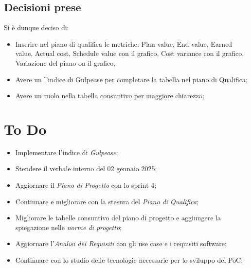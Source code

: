 \documentclass[a4paper, 12pt]{article}
\begin{document}
\subsection{Decisioni prese}
Si è dunque deciso di:
\begin{itemize}
    \item Inserire nel piano di qualifica le metriche:
    Plan value, 
    End value,
    Earned value,
    Actual cost,
    Schedule value con il grafico,
    Cost variance con il grafico,
    Variazione del piano on il grafico,
    \item Avere un l'indice di Gulpease per completare la tabella nel piano di Qualifica;
    \item Avere un ruolo nella tabella consuntivo per maggiore chiarezza;
    
\end{itemize}
\section{To Do}
\begin{itemize}
    \item Implementare l'indice di \textit{Gulpease};
    \item Stendere il verbale interno del 02 gennaio 2025;
    \item Aggiornare il \textit{Piano di Progetto} con lo sprint 4;
    \item Continuare e migliorare con la stesura del \textit{Piano di Qualifica};
    \item Migliorare le tabelle consuntivo del piano di progetto e aggiungere la spiegazione nelle \textit{norme di progetto};
    \item Aggiornare l'\textit{Analisi dei Requisiti} con gli use case e i requisiti software;
    \item Continuare con lo studio delle tecnologie necessarie per lo sviluppo del PoC;
\end{itemize}
\end{document}
